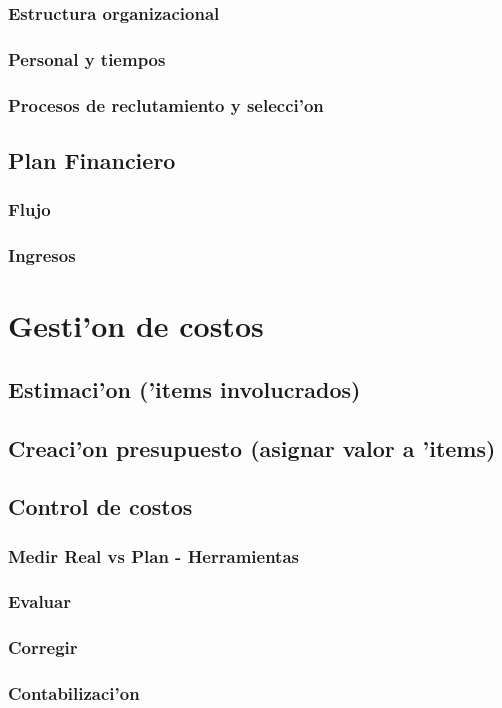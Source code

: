 \documentclass[letterpaper,openright,10pt,oneside]{report}
\begin{document}
		\section{Estructura organizacional}
		\section{Personal y tiempos}
		\section{Procesos de reclutamiento y selecci'on}
	\chapter{Plan Financiero}
		\section{Flujo}
		\section{Ingresos}
\part{Gesti'on de costos}
	\chapter{Estimaci'on ('items involucrados)}
	\chapter{Creaci'on presupuesto (asignar valor a 'items)}
	\chapter{Control de costos}
		\section{Medir Real vs Plan - Herramientas}
		\section{Evaluar}
		\section{Corregir}
		\section{Contabilizaci'on}
\end{document}
